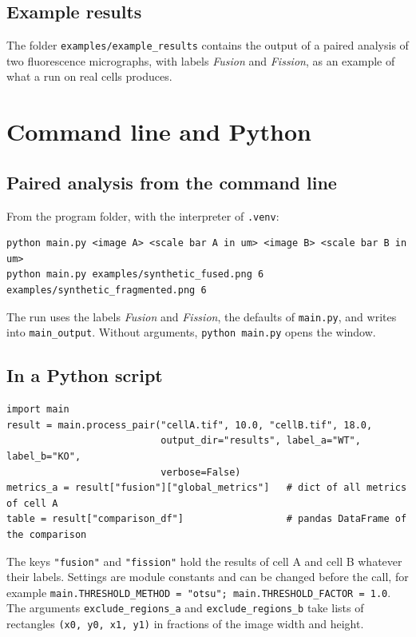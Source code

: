 \documentclass[fontsize=10.5pt,paper=a4,parskip=half,headings=normal,numbers=noenddot,
  open=any,captions=tableheading]{scrreprt}
\newcommand{\file}[1]{\texttt{#1}}
\begin{document}
\section{Example results}
The folder \file{examples/example\_results} contains the output of a paired analysis of two fluorescence micrographs, with labels \emph{Fusion} and \emph{Fission}, as an example of what a run on real cells produces.

\chapter{Command line and Python}\label{ch:cli}

\section{Paired analysis from the command line}
From the program folder, with the interpreter of \file{.venv}:
\begin{verbatim}
python main.py <image A> <scale bar A in um> <image B> <scale bar B in um>
python main.py examples/synthetic_fused.png 6 examples/synthetic_fragmented.png 6
\end{verbatim}
The run uses the labels \emph{Fusion} and \emph{Fission}, the defaults of \file{main.py}, and writes into \file{main\_output}. Without arguments, \texttt{python main.py} opens the window.

\section{In a Python script}
\begin{verbatim}
import main
result = main.process_pair("cellA.tif", 10.0, "cellB.tif", 18.0,
                           output_dir="results", label_a="WT", label_b="KO",
                           verbose=False)
metrics_a = result["fusion"]["global_metrics"]   # dict of all metrics of cell A
table = result["comparison_df"]                  # pandas DataFrame of the comparison
\end{verbatim}
The keys \texttt{"fusion"} and \texttt{"fission"} hold the results of cell A and cell B whatever their labels. Settings are module constants and can be changed before the call, for example \texttt{main.THRESHOLD\_METHOD = "otsu"; main.THRESHOLD\_FACTOR = 1.0}. The arguments \texttt{exclude\_regions\_a} and \texttt{exclude\_regions\_b} take lists of rectangles \texttt{(x0, y0, x1, y1)} in fractions of the image width and height.
\end{document}
